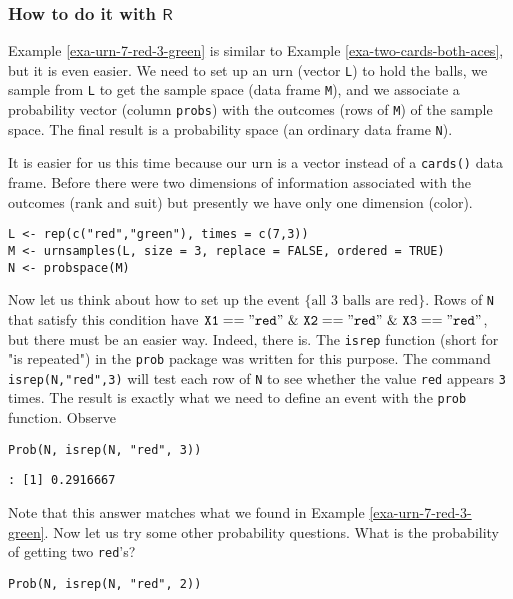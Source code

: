\subsubsection{How to do it with \(\mathsf{R}\)}
\label{sec-4-6-2-2}

Example \ref{exa-urn-7-red-3-green} is similar to Example
\ref{exa-two-cards-both-aces}, but it is even easier. We need to set up
an urn (vector \texttt{L}) to hold the balls, we sample from \texttt{L} to get the
sample space (data frame \texttt{M}), and we associate a probability vector
(column \texttt{probs}) with the outcomes (rows of \texttt{M}) of the sample
space. The final result is a probability space (an ordinary data frame
\texttt{N}).

It is easier for us this time because our urn is a vector instead of a
\texttt{cards()} data frame. Before there were two dimensions of information
associated with the outcomes (rank and suit) but presently we have
only one dimension (color).

\begin{verbatim}
L <- rep(c("red","green"), times = c(7,3))
M <- urnsamples(L, size = 3, replace = FALSE, ordered = TRUE)
N <- probspace(M)
\end{verbatim}

Now let us think about how to set up the event \(\{ \mbox{all 3 balls
are red}\} \). Rows of \texttt{N} that satisfy this condition have
\(\mathtt{X1=="red"\ \&\ X2=="red"\ \&\ X3=="red"}\), but there must
be an easier way. Indeed, there is. The \texttt{isrep} function (short for
"is repeated") in the \texttt{prob} package was written for this
purpose. The command \texttt{isrep(N,"red",3)} will test each row of \texttt{N} to
see whether the value \texttt{red} appears \texttt{3} times. The result is exactly
what we need to define an event with the \texttt{prob} function. Observe

\begin{verbatim}
Prob(N, isrep(N, "red", 3))
\end{verbatim}

\begin{verbatim}
: [1] 0.2916667
\end{verbatim}

Note that this answer matches what we found in Example
\ref{exa-urn-7-red-3-green}. Now let us try some other probability
questions. What is the probability of getting two \texttt{red}'s?

\begin{verbatim}
Prob(N, isrep(N, "red", 2))
\end{verbatim}

